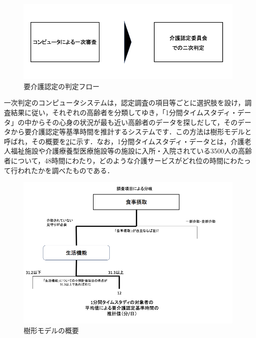 \begin{figure}[htb]
 \begin{center}
 \includegraphics[scale=0.4]{figures/hantei}
 \caption[要介護認定の判定フロー]{要介護認定の判定フロー \label{hantei}}
 \end{center}
\end{figure}

一次判定のコンピュータシステムは，認定調査の項目等ごとに選択肢を設け，調査結果に従い，それぞれの高齢者を分類してゆき，「1分間タイムスタディ・データ」の中からその心身の状況が最も近い高齢者のデータを探しだして，そのデータから要介護認定等基準時間を推計するシステムです．この方法は樹形モデルと呼ばれ，その概要を\ref{tree_model}に示す．なお，1分間タイムスタディ・データとは，介護老人福祉施設や介護療養型医療施設等の施設に入所・入院されている3500人の高齢者について，48時間にわたり，どのような介護サービスがどれ位の時間にわたって行われたかを調べたものである．

\begin{figure}[htb]
 \begin{center}
 \includegraphics[scale=0.4]{figures/tree_model}
 \caption[樹形モデルの概要]{樹形モデルの概要 \label{tree_model}}
 \end{center}
\end{figure}

